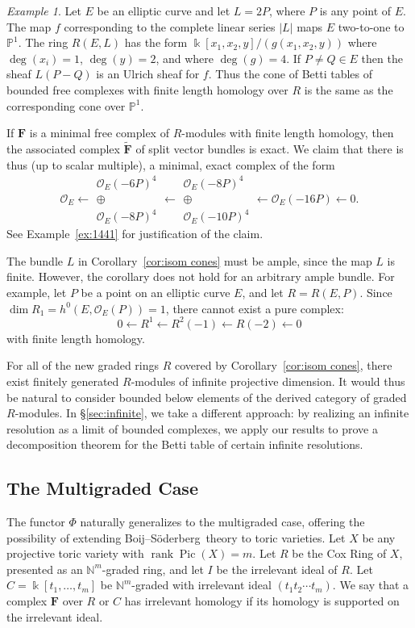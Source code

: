 \documentclass[12pt]{amsart}
\theoremstyle{definition}
\theoremstyle{remark}
\newtheorem{example}[lemma]{Example}
\newcommand{\Pic}{\operatorname{Pic}}
\newcommand{\kk}{\Bbbk}
\newcommand{\rank}{\operatorname{rank}}
\newcommand{\cO}{\mathcal{O}}
\newcommand{\FF}{\mathbf{F}}
\newcommand{\defi}[1]{\textsf{#1}} %
\renewcommand{\P}{{\mathbb P}}
\def\BS{Boij--S\"oderberg~}
\begin{document}
\begin{example}\label{ex:elliptic}
Let $E$ be an elliptic curve and let $L=2P$, where $P$ is any point of $E$.  The map $f$ corresponding to the complete
linear series $|L|$ maps $E$ two-to-one to $\P^{1}$. The ring $R(E,L)$ has the form
$\kk[x_1,x_2,y]/(g(x_{1},x_{2},y))$  where $\deg(x_i)=1$, $\deg(y)=2$, and where $\deg(g)=4$.
If $P\neq Q\in E$ then the sheaf $L(P-Q)$ is an Ulrich sheaf for $f$. Thus the cone of
Betti tables of bounded free complexes with finite length homology over $R$ is the same
as the corresponding cone over $\P^{1}$.

If $\FF$ is a minimal free complex of $R$-modules with finite length homology, then the associated complex $\widetilde{\FF}$ of split vector bundles is exact.  We claim that there is thus (up to scalar multiple), a minimal, exact complex of the form
\[
\cO_E\longleftarrow \begin{matrix}  \cO_E(-6P)^4\\ \oplus\\ \cO_E(-8P)^4\end{matrix}\longleftarrow \begin{matrix}  \cO_E(-8P)^4\\ \oplus\\ \cO_E(-10P)^4\end{matrix} \longleftarrow \cO_E(-16P)\longleftarrow 0.
\]
See Example~\ref{ex:1441} for justification of the claim.
\end{example}

The bundle $L$ in Corollary~\ref{cor:isom cones} must be ample, since the map $L$ is finite.  However, the corollary does not hold for an arbitrary ample bundle.  For example, let $P$ be a point on an elliptic curve $E$, and let $R=R(E,P)$.  Since $\dim R_1=h^0(E,\cO_E(P))=1$, there cannot exist a pure complex:
\[
0\gets R^1\gets R^2(-1)\gets R(-2)\gets 0
\]
with finite length homology.

For all of the new graded rings $R$ covered by Corollary~\ref{cor:isom cones}, there exist finitely generated $R$-modules of infinite projective dimension.  It would thus be natural to consider bounded below elements of the derived category of graded $R$-modules.  In \S\ref{sec:infinite}, we take a different approach: by realizing an infinite resolution as a limit of bounded complexes, we apply our results to prove a decomposition theorem for the Betti table of certain infinite resolutions.

\subsection*{The Multigraded Case}
The functor $\Phi$ naturally generalizes to the multigraded case, offering the possibility of extending \BS theory to toric varieties.  Let $X$ be any projective toric variety with $\rank \Pic(X)=m$.  Let $R$ be the Cox Ring of $X$, presented as an $\mathbb N^m$-graded ring, and let $I$ be the irrelevant ideal of $R$.  Let $C=\kk[t_1, \dots, t_m]$ be $\mathbb N^m$-graded with irrelevant ideal $(t_1t_2\cdots t_m)$.  We say that a complex $\FF$ over $R$ or $C$ has \defi{irrelevant homology} if its homology is supported on the irrelevant ideal.
\end{document}
